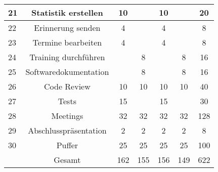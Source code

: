 \documentclass[12pt,a4paper,onecolumn]{article}
\begin{document}
\begin{tabular}{|l|c|c|c|c|c|c|}
\hline
21 & Statistik erstellen & 10 & & 10 & & 20\\
\hline
22 & Erinnerung senden & 4 & & 4 & & 8\\
\hline
23 & Termine bearbeiten & 4 & & 4 & & 8\\
\hline
24 & Training durchführen & & 8 & & 8 & 16\\
\hline
25 & Softwaredokumentation & & 8 & & 8 & 16\\
\hline
26 & Code Review & 10 & 10 & 10 & 10 & 40\\
\hline
27 & Tests & 15 & & 15 & & 30\\
\hline
28 & Meetings & 32 & 32 & 32 & 32& 128\\
\hline
29 & Abschlusspräsentation & 2 & 2 & 2 & 2 & 8\\
\hline
30 & Puffer & 25 & 25 & 25 & 25 & 100\\
\hline
\hline
 & Gesamt & 162 & 155 & 156 & 149 & 622\\
\hline
\end{tabular}
\end{document}
